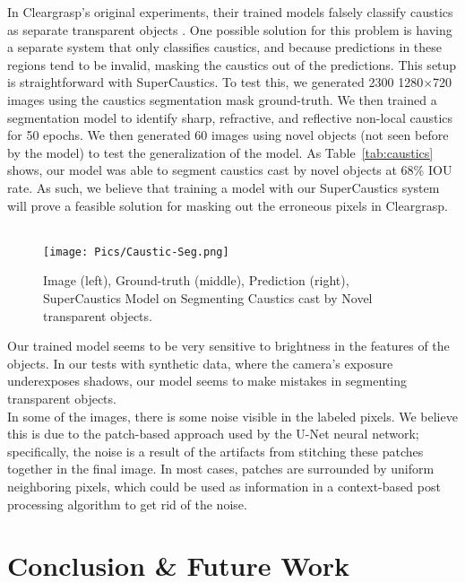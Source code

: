 \documentclass[conference]{IEEEtran}
\begin{document}
 In Cleargrasp's original experiments, their trained models falsely classify caustics as separate transparent objects \cite{cleargrasp}. One possible solution for this problem is having a separate system that only classifies caustics, and because predictions in these regions tend to be invalid, masking the caustics out of the predictions. This setup is straightforward with SuperCaustics. To test this, we generated 2300 1280$\times$720 images using the caustics segmentation mask ground-truth. We then trained a segmentation model to identify sharp, refractive, and reflective non-local caustics for 50 epochs. We then generated 60 images using novel objects (not seen before by the model) to test the generalization of the model.  As Table~\ref{tab:caustics} shows, our model was able to segment caustics cast by novel objects at 68\% IOU rate. As such, we believe that training a model with our SuperCaustics system will prove a feasible solution for masking out the erroneous pixels in Cleargrasp.\\ \\

  \begin{figure}
    \center
    \texttt{[image: Pics/Caustic-Seg.png]}
    \caption{Image (left), Ground-truth (middle), Prediction (right),  SuperCaustics Model on Segmenting Caustics cast by Novel transparent objects.}\label{caustic-seg}
  \end{figure}

 Our trained model seems to be very sensitive to brightness in the features of the objects. In our tests with synthetic data, where the camera's exposure underexposes shadows, our model seems to make mistakes in segmenting transparent objects.\\

 In some of the images, there is some noise visible in the labeled pixels. We believe this is due to the patch-based approach used by the U-Net neural network; specifically, the noise is a result of the artifacts from stitching these patches together in the final image. In most cases, patches are surrounded by uniform neighboring pixels, which could be used as information in a context-based post processing algorithm to get rid of the noise.

\section{Conclusion \& Future Work}
\end{document}
